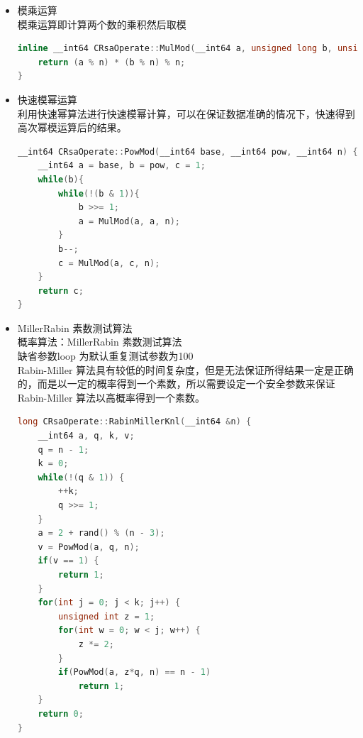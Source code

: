 \documentclass[UTF8,a4paper,10pt]{ctexart}
\begin{document}
\begin{itemize}
  \item 模乘运算\\ 
  模乘运算即计算两个数的乘积然后取模
  \begin{lstlisting}[language = c++]
inline __int64 CRsaOperate::MulMod(__int64 a, unsigned long b, unsigned long n) {
    return (a % n) * (b % n) % n;
}
\end{lstlisting}
  \item 快速模幂运算\\
  利用快速幂算法进行快速模幂计算，可以在保证数据准确的情况下，快速得到高次幂模运算后的结果。
  \begin{lstlisting}[language = c++]
__int64 CRsaOperate::PowMod(__int64 base, __int64 pow, __int64 n) {
    __int64 a = base, b = pow, c = 1;
    while(b){
        while(!(b & 1)){
            b >>= 1;
            a = MulMod(a, a, n);
        }
        b--;
        c = MulMod(a, c, n);
    }
    return c;
}
  \end{lstlisting}
  \item MillerRabin 素数测试算法\\
  概率算法：MillerRabin 素数测试算法\\
  缺省参数loop 为默认重复测试参数为100\\
  Rabin-Miller 算法具有较低的时间复杂度，但是无法保证所得结果一定是正确的，而是以一定的概率得到一个素数，所以需要设定一个安全参数来保证Rabin-Miller 算法以高概率得到一个素数。
  \begin{lstlisting}[language = c++]
long CRsaOperate::RabinMillerKnl(__int64 &n) {
    __int64 a, q, k, v;
    q = n - 1;
    k = 0;
    while(!(q & 1)) {
        ++k;
        q >>= 1;
    }
    a = 2 + rand() % (n - 3);
    v = PowMod(a, q, n);
    if(v == 1) {
        return 1;
    }
    for(int j = 0; j < k; j++) {
        unsigned int z = 1;
        for(int w = 0; w < j; w++) {
            z *= 2;
        }
        if(PowMod(a, z*q, n) == n - 1)
            return 1;
    }
    return 0;
}



\end{lstlisting}
\end{itemize}
\end{document}
